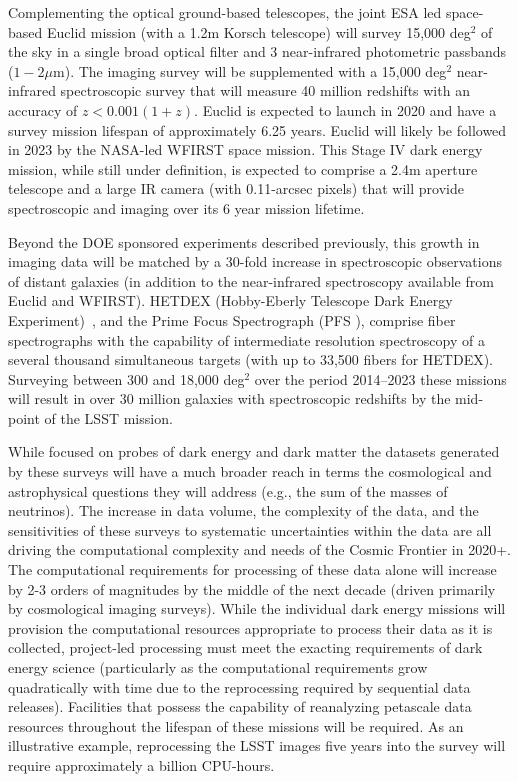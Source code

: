 Complementing the optical ground-based telescopes, the joint ESA led
space-based Euclid mission (with a 1.2m Korsch telescope) will survey
15,000 deg$^{2}$ of the sky in a single broad optical filter and 3
near-infrared photometric passbands ($1-2\mu$m). The imaging survey
will be supplemented with a 15,000 deg$^{2}$ near-infrared
spectroscopic survey that will measure 40 million redshifts with an
accuracy of $z < 0.001(1+z)$.  Euclid is expected to launch in 2020
and have a survey mission lifespan of approximately 6.25 years. Euclid
will likely be followed in 2023 by the NASA-led WFIRST space
mission. This Stage IV dark energy mission, while still under
definition, is expected to comprise a 2.4m aperture telescope and a
large IR camera (with 0.11-arcsec pixels) that will provide
spectroscopic and imaging over its 6 year mission lifetime.

Beyond the DOE sponsored experiments described previously, this growth
in imaging data will be matched by a 30-fold increase in spectroscopic
observations of distant galaxies (in addition to the near-infrared
spectroscopy available from Euclid and WFIRST). HETDEX (Hobby-Eberly
Telescope Dark Energy Experiment)~\cite{hetdex}, and the Prime Focus
Spectrograph (PFS \cite{pfs}), comprise fiber spectrographs with the
capability of intermediate resolution spectroscopy of a several
thousand simultaneous targets (with up to 33,500 fibers for
HETDEX). Surveying between 300 and 18,000 deg$^{2}$ over the period
2014--2023 these missions will result in over 30 million galaxies with
spectroscopic redshifts by the mid-point of the LSST mission.

While focused on probes of dark energy and dark matter the datasets
generated by these surveys will have a much broader reach in terms the
cosmological and astrophysical questions they will address (e.g., the
sum of the masses of neutrinos). The increase in data volume, the
complexity of the data, and the sensitivities of these surveys to
systematic uncertainties within the data are all driving the
computational complexity and needs of the Cosmic Frontier in
2020+. The computational requirements for processing of these data
alone will increase by 2-3 orders of magnitudes by the middle of the
next decade (driven primarily by cosmological imaging surveys). While
the individual dark energy missions will provision the computational
resources appropriate to process their data as it is collected,
project-led processing must meet the exacting requirements of dark
energy science (particularly as the computational requirements grow
quadratically with time due to the reprocessing required by sequential
data releases). Facilities that possess the capability of reanalyzing
petascale data resources throughout the lifespan of these missions
will be required. As an illustrative example, reprocessing the LSST
images five years into the survey will require approximately a billion
CPU-hours.

